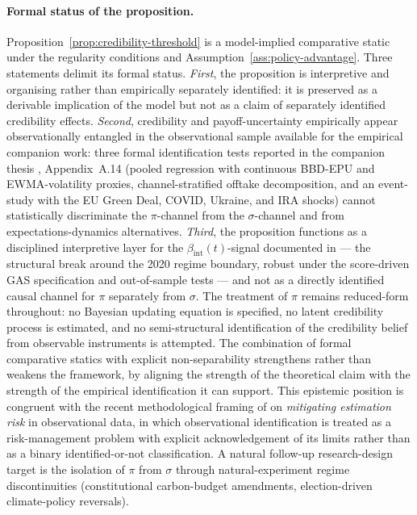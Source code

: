 \documentclass[12pt,a4paper]{article}
\newcommand{\bint}{\beta_{\text{int}}}
\theoremstyle{plain}
\theoremstyle{definition}
\begin{document}
\paragraph{Formal status of the proposition.}
Proposition~\ref{prop:credibility-threshold} is a model-implied comparative static under the regularity conditions and Assumption~\ref{ass:policy-advantage}. Three statements delimit its formal status. \emph{First}, the proposition is interpretive and organising rather than empirically separately identified: it is preserved as a derivable implication of the model but not as a claim of separately identified credibility effects. \emph{Second}, credibility and payoff-uncertainty empirically appear observationally entangled in the observational sample available for the empirical companion work: three formal identification tests reported in the companion thesis \citep{saakstra2026thesis}, Appendix~A.14 (pooled regression with continuous BBD-EPU and EWMA-volatility proxies, channel-stratified offtake decomposition, and an event-study with the EU Green Deal, COVID, Ukraine, and IRA shocks) cannot statistically discriminate the $\pi$-channel from the $\sigma$-channel and from expectations-dynamics alternatives. \emph{Third}, the proposition functions as a disciplined interpretive layer for the $\bint(t)$-signal documented in \cite{saakstra2026paper1} --- the structural break around the 2020 regime boundary, robust under the score-driven GAS specification and out-of-sample tests --- and not as a directly identified causal channel for $\pi$ separately from $\sigma$. The treatment of $\pi$ remains reduced-form throughout: no Bayesian updating equation is specified, no latent credibility process is estimated, and no semi-structural identification of the credibility belief from observable instruments is attempted. The combination of formal comparative statics with explicit non-separability strengthens rather than weakens the framework, by aligning the strength of the theoretical claim with the strength of the empirical identification it can support. This epistemic position is congruent with the recent methodological framing of \citet{blasques2024mitigating} on \emph{mitigating estimation risk} in observational data, in which observational identification is treated as a risk-management problem with explicit acknowledgement of its limits rather than as a binary identified-or-not classification. A natural follow-up research-design target is the isolation of $\pi$ from $\sigma$ through natural-experiment regime discontinuities (constitutional carbon-budget amendments, election-driven climate-policy reversals).
\end{document}
